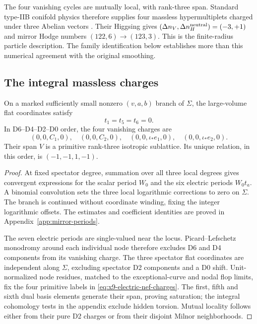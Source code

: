 The four vanishing cycles are mutually local, with rank-three
span. Standard type-IIB conifold physics therefore supplies four
massless hypermultiplets charged under three Abelian vectors
\cite{Strominger:1995Conifold,Greene:1995hu}. Their Higgsing gives
$(\Delta n_V,\Delta n_H^{\rm neutral})=(-3,+1)$ and mirror
Hodge numbers $(122,6)\to(123,3)$. This is the finite-radius
particle description. The family identification below establishes
more than this numerical agreement with the original smoothing.

\subsection{The integral massless charges}

\begin{proposition}\label{prop:x9-integral-charges}
On a marked sufficiently small nonzero $(v,a,b)$ branch of $\Sigma$,
the large-volume flat coordinates satisfy
\begin{equation}
 t_1=t_5=t_6=0.
 \label{eq:x9-finite-bulk-flat-locus}
\end{equation}
In D6--D4--D2--D0 order, the four vanishing charges are
\begin{equation}
 (0,0,C_1,0),\quad(0,0,C_2,0),\quad
 (0,0,\iota_*e_1,0),\quad(0,0,\iota_*e_2,0).
 \label{eq:x9-finite-bulk-integral-charges}
\end{equation}
Their span $V$ is a primitive rank-three isotropic sublattice.
Its unique relation, in this order, is $(-1,-1,1,-1)$.
\end{proposition}
\begin{proof}
At fixed spectator degree, summation over all three local degrees
gives convergent expressions for the scalar period $W_0$ and
the six electric periods $W_0t_a$. A binomial convolution sets
the three local logarithmic corrections to zero on $\Sigma$.
The branch is continued without coordinate winding, fixing the
integer logarithmic offsets. The estimates and coefficient
identities are proved in Appendix~\ref{app:mirror-periods}.

The seven electric periods are single-valued near the locus.
Picard--Lefschetz monodromy around each individual node therefore
excludes D6 and D4 components from its vanishing charge. The
three spectator flat coordinates are independent along $\Sigma$,
excluding spectator D2 components and a D0 shift. Unit-normalized
node residues, matched to the exceptional-curve and nodal flop
limits, fix the four primitive labels in
\eqref{eq:x9-electric-nef-charges}. The first, fifth and sixth
dual basis elements generate their span, proving saturation;
the integral cohomology tests in the appendix exclude hidden
torsion. Mutual locality follows either from their pure D2
charges or from their disjoint Milnor neighborhoods.
\end{proof}

